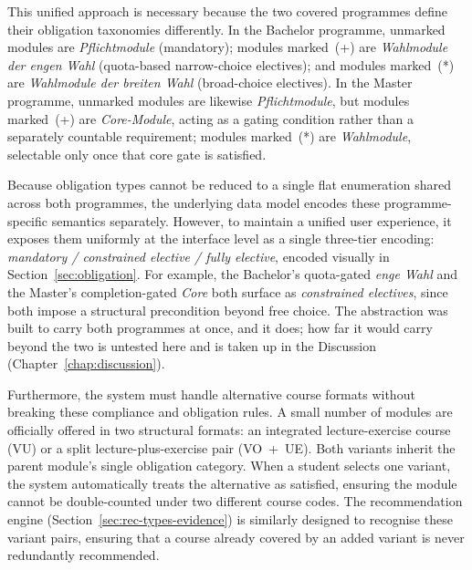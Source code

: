 This unified approach is necessary because the two covered programmes define their obligation taxonomies differently. In the Bachelor programme, unmarked modules are \emph{Pflichtmodule} (mandatory); modules marked~(+) are \emph{Wahlmodule der engen Wahl} (quota-based narrow-choice electives); and modules marked~(*) are \emph{Wahlmodule der breiten Wahl} (broad-choice electives). In the Master programme, unmarked modules are likewise \emph{Pflichtmodule}, but modules marked~(+) are \emph{Core-Module}, acting as a gating condition rather than a separately countable requirement; modules marked~(*) are \emph{Wahlmodule}, selectable only once that core gate is satisfied. 

Because obligation types cannot be reduced to a single flat enumeration shared across both programmes, the underlying data model encodes these programme-specific semantics separately. However, to maintain a unified user experience, it exposes them uniformly at the interface level as a single three-tier encoding: \emph{mandatory / constrained elective / fully elective}, encoded visually in Section~\ref{sec:obligation}. For example, the Bachelor's quota-gated \emph{enge Wahl} and the Master's completion-gated \emph{Core} both surface as \emph{constrained electives}, since both impose a structural precondition beyond free choice. The abstraction was built to carry both programmes at once, and it does; how far it would carry beyond the two is untested here and is taken up in the Discussion (Chapter~\ref{chap:discussion}).

Furthermore, the system must handle alternative course formats without breaking these compliance and obligation rules. A small number of modules are officially offered in two structural formats: an integrated lecture-exercise course (VU) or a split lecture-plus-exercise pair (VO~+~UE). Both variants inherit the parent module's single obligation category. When a student selects one variant, the system automatically treats the alternative as satisfied, ensuring the module cannot be double-counted under two different course codes. The recommendation engine (Section~\ref{sec:rec-types-evidence}) is similarly designed to recognise these variant pairs, ensuring that a course already covered by an added variant is never redundantly recommended.

